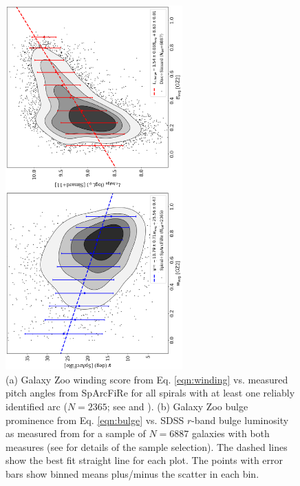 \documentclass[usenatbib]{mn2e}
\begin{document}
\begin{figure}
\includegraphics[height=140mm,angle=-90]{Figure4.ps}
\caption{(a) Galaxy Zoo winding score from Eq. \ref{eqn:winding} vs. measured pitch angles from SpArcFiRe for all spirals with at least one reliably identified arc ($N=2365$; see \citealt{DavisHayes2014} and \citealt{Hart2017b}). (b) Galaxy Zoo bulge prominence from Eq. \ref{eqn:bulge} vs. SDSS $r$-band bulge luminosity as measured from \citet{Simard2011} for a sample of $N=6887$ galaxies with both measures (see  \citealt{Hart2017b} for details of the sample selection). The dashed lines show the best fit straight line for each plot. The points with error bars show binned means plus/minus the scatter in each bin. \label{pitch}}
\end{figure}
\end{document}

